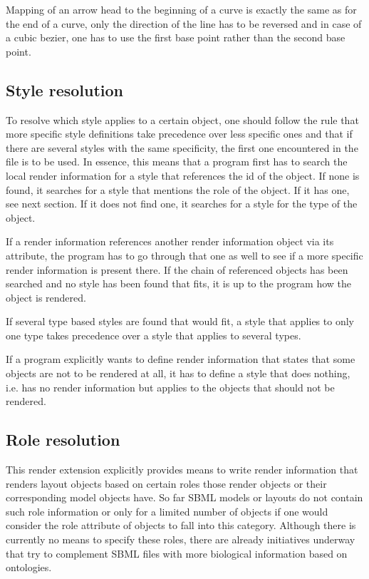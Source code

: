 Mapping of an arrow head to the beginning of a curve is exactly the same as for the end of a curve, only the
direction of the line has to be reversed and in case of a cubic bezier, one has to use the first base point rather than the second base point. 

\subsection{Style resolution}
\label{style-res}

To resolve which style applies to a certain object, one 
should follow the rule that more specific style definitions take precedence 
over less specific ones and that if there are several styles with the same 
specificity, the first one encountered in the file is to be used. In essence,
this means that a program first has to search the local render information for 
a style that references the id of the object. If none is found, it searches for 
a style that mentions the role of the object. If it has one, see next section. 
If it does not find one, it searches for a style for the type of the object. 

If a render information references another render information object via its 
 attribute, the program has to go through 
that one as well to see if a more specific render information is present there. 
If the chain of referenced \RenderInformation objects has been searched and no 
style has been found that fits, it is up to the program how the object is 
rendered. 

If several type based styles are found 
that would fit, a style that applies to only one type takes precedence over a 
style that applies to several types.

If a program explicitly wants to define render information that 
states that some objects are not to be rendered at all, it has to define a 
style that does nothing, i.e. has no render information but applies to the 
objects that should not be rendered. 


\subsection{Role resolution}
\label{role-res}

This render extension explicitly provides means to write render information
that renders layout objects based on certain roles those render objects or their
corresponding model objects have. So far SBML models or layouts do not contain
such role information or only for a limited number of objects if one would
consider the role attribute of  objects to fall into this category.
Although there is currently no means to specify these roles, there are already
initiatives underway that try to complement SBML files with more biological
information based on ontologies.  

